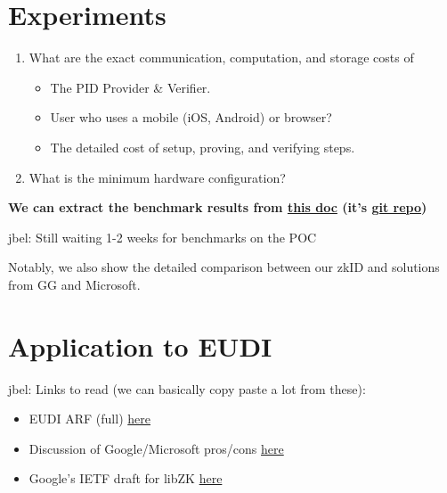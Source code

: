 \documentclass{iacrtrans}
\newcommand{\jbel}[1]{{\color{blue}{}jbel: #1}}
\begin{document}



\section{Experiments}
\label{sec:experiments}
\begin{enumerate}
    \item What are the exact communication, computation, and storage costs of \begin{itemize}
        \item The PID Provider \& Verifier.
        \item User who uses a mobile (iOS, Android) or browser?
        \item The detailed cost of setup, proving, and verifying steps.
    \end{itemize}
    \item What is the minimum hardware configuration? 
\end{enumerate}

\textbf{We can extract the benchmark results from \href{https://hackmd.io/@clientsideproving/zkIDBenchmarks}{this doc} (it's \href{https://github.com/privacy-scaling-explorations/zkid-benchmarks}{git repo}) }

\jbel{Still waiting 1-2 weeks for benchmarks on the POC}

Notably, we also show the detailed comparison between our zkID and solutions from GG and Microsoft.


\section{Application to EUDI}
\label{sec:appeudi}

\jbel{Links to read (we can basically copy paste a lot from these):
\begin{itemize}
\item EUDI ARF (full) \href{https://eu-digital-identity-wallet.github.io/eudi-doc-architecture-and-reference-framework/latest/}{here}
\item Discussion of Google/Microsoft pros/cons \href{https://github.com/eu-digital-identity-wallet/eudi-doc-standards-and-technical-specifications/blob/main/docs/technical-specifications/ts4-zkp.md}{here}
\item Google's IETF draft for libZK \href{https://www.ietf.org/id/draft-google-cfrg-libzk-00.html#name-sumcheck}{here}
\end{itemize}}
\end{document}
